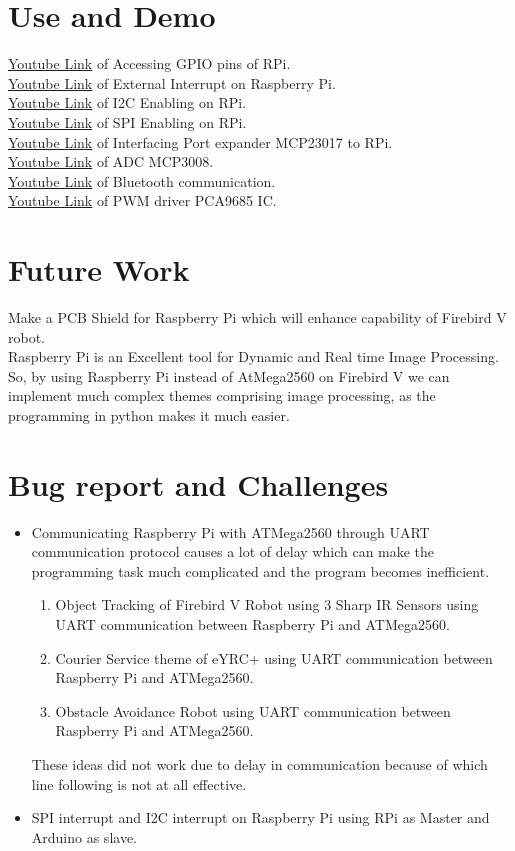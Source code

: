 \documentclass[a4paper,12pt,oneside]{book}
\begin{document}
\section{Use and Demo}

\href{https://youtu.be/oxJpwd1q_dY}{Youtube Link} of Accessing GPIO pins of RPi. \\
\href{https://youtu.be/Fn3AqdrCMGo}{Youtube Link} of External Interrupt on Raspberry Pi.\\
\href{https://youtu.be/dhToItyDWhE}{Youtube Link} of I2C Enabling on RPi.\\
\href{https://youtu.be/5fbYMdtAb2E}{Youtube Link} of SPI Enabling on RPi.\\
\href{https://youtu.be/bD0IaSN4_MM}{Youtube Link} of Interfacing Port expander MCP23017 to RPi.\\
\href{https://youtu.be/CWC4LPlKH_k}{Youtube Link} of ADC MCP3008. \\
\href{https://youtu.be/3ISq36l3NLc}{Youtube Link} of Bluetooth communication. \\
\href{https://youtu.be/qROTqvKYI3w}{Youtube Link} of PWM driver PCA9685 IC.   \\


\section{Future Work}
Make a PCB Shield for Raspberry Pi which will enhance capability of Firebird V robot.\\
Raspberry Pi is an Excellent tool for Dynamic and Real time Image Processing. So, by using Raspberry Pi instead of AtMega2560 on Firebird V we can implement much complex themes comprising image processing, as the 
programming in python makes it much easier.
\section{Bug report and Challenges}
\begin{itemize}
    \item Communicating Raspberry Pi with ATMega2560 through UART communication protocol causes a lot of delay which can make the programming task much complicated and the program becomes inefficient.
    \begin{enumerate}
        \item Object Tracking of Firebird V Robot using 3 Sharp IR Sensors using UART communication between Raspberry Pi and ATMega2560.
        \item Courier Service theme of eYRC+ using UART communication between Raspberry Pi and ATMega2560.
        \item Obstacle Avoidance Robot using UART communication between Raspberry Pi and ATMega2560.
    \end{enumerate}
     These ideas did not work due to delay in communication because of which line following is not at all effective.
    \item SPI interrupt and I2C interrupt on Raspberry Pi using RPi as Master and Arduino as slave.  
\end{itemize}
\end{document}
